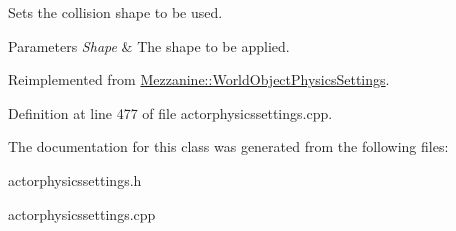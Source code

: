 Sets the collision shape to be used. 


\begin{DoxyParams}{Parameters}
{\em Shape} & The shape to be applied. \\
\hline
\end{DoxyParams}


Reimplemented from \hyperlink{classMezzanine_1_1WorldObjectPhysicsSettings_ae8b786e26eed334b283156b442807039}{Mezzanine::WorldObjectPhysicsSettings}.



Definition at line 477 of file actorphysicssettings.cpp.



The documentation for this class was generated from the following files:\begin{DoxyCompactItemize}
\item 
actorphysicssettings.h\item 
actorphysicssettings.cpp\end{DoxyCompactItemize}
